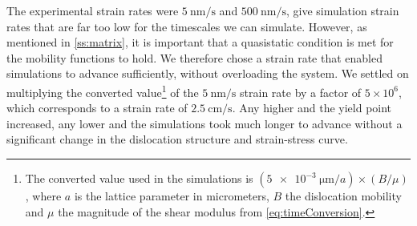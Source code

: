 The experimental strain rates were $\SI{5}{\nano\metre\per\second}$ and $\SI{500}{\nano\metre\per\second}$, give simulation strain rates that are far too low for the timescales we can simulate. However, as mentioned in \cref{ss:matrix}, it is important that a quasistatic condition is met for the mobility functions to hold. We therefore chose a strain rate that enabled simulations to advance sufficiently, without overloading the system. We settled on multiplying the converted value\footnote{The converted value used in the simulations is $\left(\SI{5e-3}{\micro\metre}/a\right) \times \left(B /  \mu \right)$, where $a$ is the lattice parameter in micrometers, $B$ the dislocation mobility and $ \mu $ the magnitude of the shear modulus from \cref{eq:timeConversion}.} of the $\SI{5}{\nano\metre\per\second}$ strain rate by a factor of $5 \times 10^6$, which corresponds to a strain rate of $\SI{2.5}{\centi\metre\per\second}$. Any higher and the yield point increased, any lower and the simulations took much longer to advance without a significant change in the dislocation structure and strain-stress curve.

